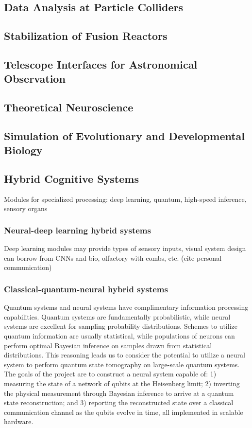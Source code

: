 \subsection{Data Analysis at Particle Colliders}

\subsection{Stabilization of Fusion Reactors}
\cite{kasv2019}

\subsection{Telescope Interfaces for Astronomical Observation}

\subsection{Theoretical Neuroscience}

\subsection{Simulation of Evolutionary and Developmental Biology}

\subsection{Hybrid Cognitive Systems}

Modules for specialized processing: deep learning, quantum, high-speed inference, sensory organs

\subsubsection{Neural-deep learning hybrid systems}
Deep learning modules may provide types of sensory inputs, visual system design can borrow from CNNs and bio, olfactory with combs, etc. (cite personal communication)

\subsubsection{Classical-quantum-neural hybrid systems}
Quantum systems and neural systems have complimentary information processing capabilities. Quantum systems are fundamentally probabilistic, while neural systems are excellent for sampling probability distributions. Schemes to utilize quantum information are usually statistical, while populations of neurons can perform optimal Bayesian inference on samples drawn from statistical distributions. This reasoning leads us to consider the potential to utilize a neural system to perform quantum state tomography on large-scale quantum systems. The goals of the project are to construct a neural system capable of: 1) measuring the state of a network of qubits at the Heisenberg limit; 2) inverting the physical measurement through Bayesian inference to arrive at a quantum state reconstruction; and 3) reporting the reconstructed state over a classical communication channel as the qubits evolve in time, all implemented in scalable hardware.

